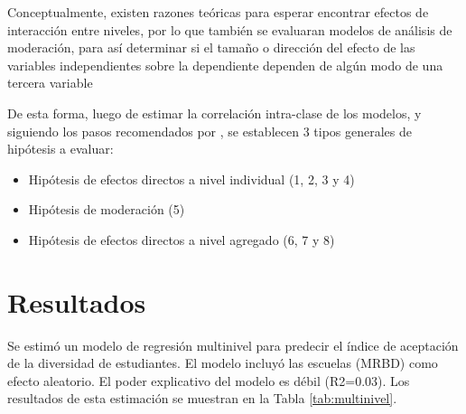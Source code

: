 \documentclass[12pt,twoside]{templates/facsothesis}
\begin{document}
Conceptualmente, existen razones teóricas para esperar encontrar efectos de interacción entre niveles, por lo que también se evaluaran modelos de análisis de moderación, para así determinar si el tamaño o dirección del efecto de las variables independientes sobre la dependiente dependen de algún modo de una tercera variable \citep{hayes_introduction_2022}

De esta forma, luego de estimar la correlación intra-clase de los modelos, y siguiendo los pasos recomendados por \citet{aguinis_BestPractice_2013}, se establecen 3 tipos generales de hipótesis a evaluar:

\begin{itemize}
\item
  Hipótesis de efectos directos a nivel individual (1, 2, 3 y 4)
\item
  Hipótesis de moderación (5)
\item
  Hipótesis de efectos directos a nivel agregado (6, 7 y 8)
\end{itemize}

\hypertarget{resultados}{%
\chapter{Resultados}\label{resultados}}

Se estimó un modelo de regresión multinivel para predecir el índice de aceptación de la diversidad de estudiantes. El modelo incluyó las escuelas (MRBD) como efecto aleatorio. El poder explicativo del modelo es débil (R2=0.03). Los resultados de esta estimación se muestran en la Tabla \ref{tab:multinivel}.
\end{document}
